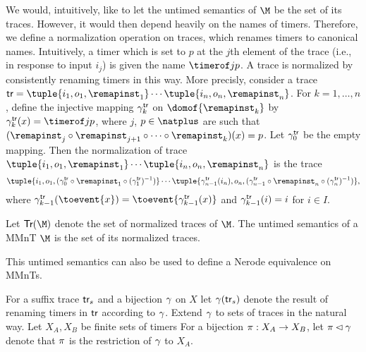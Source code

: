 We would, intuitively, like to let the untimed semantics of $\M$ be the set
of its traces. However, it would then depend heavily on the names of
timers. Therefore, we define a normalization operation on traces, which
renames timers to canonical names.
Intuitively, a timer which is set to $p$ at the $j$th element of the trace
(i.e., in response to input $i_j$) is given the name $\timerof jp$.
A trace is normalized by consistently renaming timers in this way.
More precisly, 
consider a trace 
$\uttrace = \tuple{i_1,o_1,\remapinst_1}\cdots\tuple{i_n,o_n,\remapinst_n}$.
For $k=1, \ldots , n$,
define the injective mapping $\gamma_{k}^{\textsf{tr}}$ on $\domof{\remapinst_k}$ by
$\normalizeof{\uttrace}{k}(x) = \timerof jp$, where 
$j$, $p \in \natplus$ are such that
$(\remapinst_j \circ \remapinst_{j+1} \circ \cdots \circ \remapinst_k)(x) = p$.
Let $\gamma_{0}^{\textsf{tr}}$ be the empty mapping.
Then the normalization of trace
$\tuple{i_1,o_1,\remapinst_1}\cdots\tuple{i_n,o_n,\remapinst_n}$ is
the trace
\[
\tuple{i_1,o_1,(\normalizeof{\uttrace}{0} \circ \remapinst_1 \circ (\normalizeof{\uttrace}{1})^{-1})}\cdots
\tuple{\normalizeof{\uttrace}{n-1}(i_n),o_n,(\normalizeof{\uttrace}{n-1} \circ \remapinst_n \circ (\normalizeof{\uttrace}{n})^{-1})}
,
\]
where $\normalizeof{\uttrace}{k-1}(\toevent{x}) = \toevent{\normalizeof{\uttrace}{k-1}(x)}$ and
$\gamma_{k-1}^{\textsf{tr}}(i) = i$ for $i \in I$.

Let $\uttracesof{\M}$ denote the set of normalized traces of $\M$.
The untimed semantics of a MMnT $\M$ is the set of its normalized traces.

This untimed semantics can also be used to define a Nerode equivalence on
MMnTs.

For a suffix trace $\textsf{tr}_s$ and a bijection $\gamma$ on $X$ let
$\gamma(\textsf{tr}_s)$ denote the result of renaming timers in $\textsf{tr}$
according to $\gamma$.
Extend $\gamma$ to sets of traces in the natural way.
Let $X_A, X_B$ be finite sets of timers
For a bijection $\pi: X_A \rightarrow X_B$, let
$\pi \lhd\gamma$ denote that $\pi$ is the restriction
of $\gamma$ to $X_A$.

